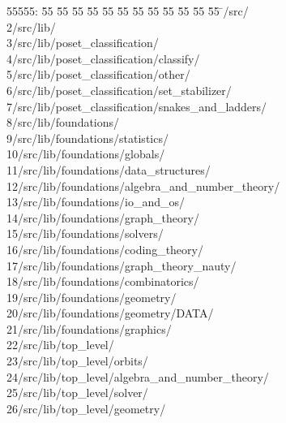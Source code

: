 %
%
\begin{tabbing}
55555: \= 55 \= 55 \= 55 \= 55 \= 55 \= 55 \= 55 \= 55 \= 55 \= 55 \= 55 \= 55 \= \>/src/\\[0pt]
2\>/src/lib/\\[0pt]
3\>/src/lib/poset\_classification/\\[0pt]
4\>/src/lib/poset\_classification/classify/\\[0pt]
5\>/src/lib/poset\_classification/other/\\[0pt]
6\>/src/lib/poset\_classification/set\_stabilizer/\\[0pt]
7\>/src/lib/poset\_classification/snakes\_and\_ladders/\\[0pt]
8\>/src/lib/foundations/\\[0pt]
9\>/src/lib/foundations/statistics/\\[0pt]
10\>/src/lib/foundations/globals/\\[0pt]
11\>/src/lib/foundations/data\_structures/\\[0pt]
12\>/src/lib/foundations/algebra\_and\_number\_theory/\\[0pt]
13\>/src/lib/foundations/io\_and\_os/\\[0pt]
14\>/src/lib/foundations/graph\_theory/\\[0pt]
15\>/src/lib/foundations/solvers/\\[0pt]
16\>/src/lib/foundations/coding\_theory/\\[0pt]
17\>/src/lib/foundations/graph\_theory\_nauty/\\[0pt]
18\>/src/lib/foundations/combinatorics/\\[0pt]
19\>/src/lib/foundations/geometry/\\[0pt]
20\>/src/lib/foundations/geometry/DATA/\\[0pt]
21\>/src/lib/foundations/graphics/\\[0pt]
22\>/src/lib/top\_level/\\[0pt]
23\>/src/lib/top\_level/orbits/\\[0pt]
24\>/src/lib/top\_level/algebra\_and\_number\_theory/\\[0pt]
25\>/src/lib/top\_level/solver/\\[0pt]
26\>/src/lib/top\_level/geometry/\\[0pt]

\end{tabbing}

